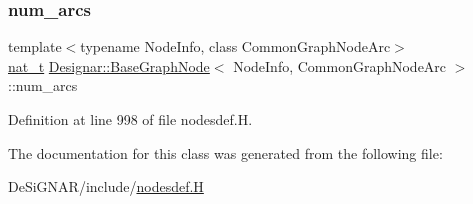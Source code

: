 \mbox{\label{class_designar_1_1_base_graph_node_a035347b8e1ffaca5df73b42bef300e0f}} 
\subsubsection{\texorpdfstring{num\+\_\+arcs}{num\_arcs}}
{\footnotesize\ttfamily template$<$typename Node\+Info, class Common\+Graph\+Node\+Arc$>$ \\
\hyperlink{namespace_designar_aa72662848b9f4815e7bf31a7cf3e33d1}{nat\+\_\+t} \hyperlink{class_designar_1_1_base_graph_node}{Designar\+::\+Base\+Graph\+Node}$<$ Node\+Info, Common\+Graph\+Node\+Arc $>$\+::num\+\_\+arcs\hspace{0.3cm}{\ttfamily [protected]}}



Definition at line 998 of file nodesdef.\+H.



The documentation for this class was generated from the following file\+:\begin{DoxyCompactItemize}
\item 
De\+Si\+G\+N\+A\+R/include/\hyperlink{nodesdef_8_h}{nodesdef.\+H}\end{DoxyCompactItemize}
